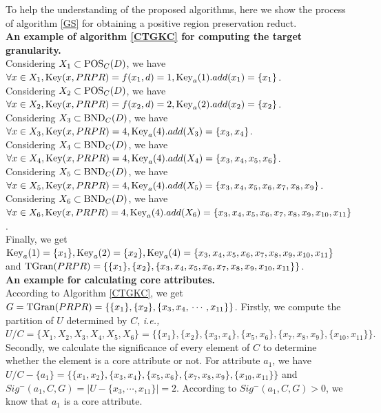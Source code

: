 \documentclass[review]{elsarticle}
\begin{document}
		\par To help the understanding of the proposed algorithms, here we show the process of algorithm \ref{GS} for obtaining a positive region preservation reduct.
		\\\textbf{An example of algorithm \ref{CTGKC} for computing the target granularity.}\\
		Considering $X_1 \subset {\rm POS}_C(D)$, we have $\forall x \in X_1, {\rm Key}(x,PRPR)=f(x_1,d)=1, {\rm Key}_a(1).add(x_1)=\{x_1\}$.\\
		Considering $X_2 \subset {\rm POS}_C(D)$, we have $\forall x \in X_2, {\rm Key}(x,PRPR)=f(x_2,d)=2, {\rm Key}_a(2).add(x_2)=\{x_2\}$.\\
		Considering $X_3 \subset {\rm BND}_C(D)$, we have $\forall x \in X_3, {\rm Key}(x,PRPR)=4, {\rm Key}_a(4).add(X_3)\\=\{x_3,x_4\}$.\\
		Considering $X_4 \subset {\rm BND}_C(D)$, we have $\forall x \in X_4, {\rm Key}(x,PRPR)=4, {\rm Key}_a(4).add(X_4)\\=\{x_3,x_4,x_5,x_6\}$.\\
		Considering $X_5 \subset {\rm BND}_C(D)$, we have $\forall x \in X_5, {\rm Key}(x,PRPR)=4, {\rm Key}_a(4).add(X_5)\\=\{x_3,x_4,x_5,x_6,x_7,x_8,x_9\}$.\\
		Considering $X_6 \subset {\rm BND}_C(D)$, we have $\forall x \in X_6, {\rm Key}(x,PRPR)=4, {\rm Key}_a(4).add(X_6)\\=\{x_3,x_4,x_5,x_6,x_7,x_8,x_9,x_{10},x_{11}\}$.\\
		Finally, we get ${\rm Key}_a(1)=\{x_1\},{\rm Key}_a(2)=\{x_2\},{\rm Key}_a(4)=\{x_3,x_4,x_5,x_6,x_7,x_8,x_9,x_{10},
		\\x_{11}\}$ and ${\rm TGran}(PRPR)=\{\{x_1\},\{x_2\},\{x_3,x_4,x_5,x_6,x_7,x_8,x_9,x_{10},x_{11}\}\}$.
		\\\textbf{An example for calculating core attributes.}\\%
		According to Algorithm \ref{CTGKC}, we get $G={\rm TGran}(PRPR)=\{\{x_1\},\{x_2\},\{x_3,x_4,
		\\\cdots,x_{11}\}\}$.
		Firstly, we compute the partition of $U$ determined by $C$, \emph{i.e.,} $U/C=\lbrace X_{1},X_{2},X_{3},X_{4},X_{5},X_{6} \rbrace=\lbrace \lbrace x_{1} \rbrace,\lbrace x_{2} \rbrace,\lbrace x_{3},x_{4} \rbrace,\lbrace x_{5},x_{6} \rbrace,
		\lbrace x_{7},x_{8},x_{9} \rbrace,\lbrace x_{10},x_{11} \rbrace \rbrace.$
		Secondly, we calculate the significance of every element of $C$ to determine whether the element is a core attribute or not. For attribute $a_1$, we have $U/C-\{a_1\}=\{\{x_1,x_2\},\{x_3,x_4\},\{x_5,x_6\},\{x_7,x_8,x_9\},\{x_{10},x_{11}\}\}$ and $ Sig^-(a_1,C,G)=|U-\{x_3,\cdots,x_{11}\}|=2$. According to $Sig^-(a_1,C,G)>0$, we know that $a_1$ is a core attribute.
\end{document}
